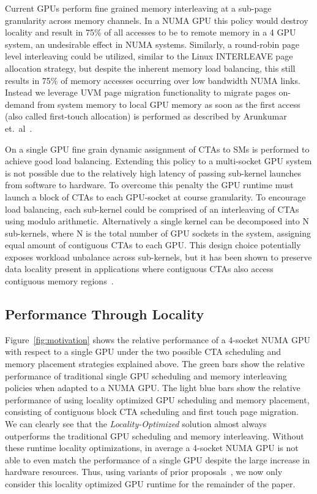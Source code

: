 Current GPUs perform fine grained memory interleaving at a sub-page granularity 
across memory channels.  In a NUMA GPU this policy would destroy locality and 
result in 75\% of all accesses to be to remote memory in a 4 GPU system, an 
undesirable effect in NUMA systems.  Similarly, a round-robin page level 
interleaving could be utilized, similar to the Linux INTERLEAVE page allocation 
strategy, but despite the inherent memory load balancing, this still results in 
75\% of memory accesses occurring over low bandwidth NUMA links. Instead we 
leverage UVM page migration functionality to migrate pages on-demand from system 
memory to local GPU memory as soon as the first access (also called first-touch 
allocation) is performed as described by Arunkumar et.~al~\cite{Arunkumar2017}.

On a single GPU fine grain dynamic assignment of CTAs to SMs is performed to 
achieve good load balancing.  Extending this policy to a multi-socket GPU 
system is not possible due to the relatively high latency of passing sub-kernel 
launches from software to hardware.  To overcome this penalty the GPU runtime 
must launch a block of CTAs to each GPU-socket at course granularity.  To 
encourage load balancing, each sub-kernel could be comprised of an interleaving 
of CTAs using modulo arithmetic.  Alternatively a single kernel can be 
decomposed into N sub-kernels, where N is the total number of GPU sockets in 
the system, assigning equal amount of contiguous CTAs to each GPU.  This design 
choice potentially exposes workload unbalance across sub-kernels, but it has 
been shown to preserve data locality present in applications where contiguous 
CTAs also access contiguous memory regions~\cite{Cabezas2015,Arunkumar2017}.

\subsection{Performance Through Locality} 

Figure~\ref{fig:motivation} shows the relative performance of a 4-socket NUMA 
GPU with respect to a single GPU under the two possible CTA scheduling and 
memory placement strategies explained above.  The green bars show the 
relative performance of traditional single GPU scheduling and memory 
interleaving policies when adapted to a NUMA GPU. The light blue bars
show the relative performance of using locality optimized GPU scheduling and 
memory placement, consisting of contiguous block CTA scheduling and first touch 
page migration. We can clearly see that the \textit{Locality-Optimized} 
solution almost always outperforms the traditional GPU scheduling and memory 
interleaving.  Without these runtime locality optimizations, in average a 4-socket NUMA 
GPU is not able to even match the performance of a single GPU despite the large 
increase in hardware resources.  Thus, using variants of prior 
proposals~\cite{Cabezas2015,Arunkumar2017}, we now only consider this locality 
optimized GPU runtime for the remainder of the paper.

